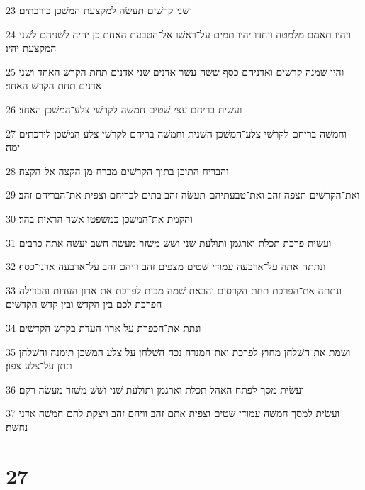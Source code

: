 \par 23 ושׁני קרשׁים תעשׂה למקצעת המשׁכן בירכתים׃
\par 24 ויהיו תאמם מלמטה ויחדו יהיו תמים על־ראשׁו אל־הטבעת האחת כן יהיה לשׁניהם לשׁני המקצעת יהיו׃
\par 25 והיו שׁמנה קרשׁים ואדניהם כסף שׁשׁה עשׂר אדנים שׁני אדנים תחת הקרשׁ האחד ושׁני אדנים תחת הקרשׁ האחד׃
\par 26 ועשׂית בריחם עצי שׁטים חמשׁה לקרשׁי צלע־המשׁכן האחד׃
\par 27 וחמשׁה בריחם לקרשׁי צלע־המשׁכן השׁנית וחמשׁה בריחם לקרשׁי צלע המשׁכן לירכתים ימה׃
\par 28 והבריח התיכן בתוך הקרשׁים מברח מן־הקצה אל־הקצה׃
\par 29 ואת־הקרשׁים תצפה זהב ואת־טבעתיהם תעשׂה זהב בתים לבריחם וצפית את־הבריחם זהב׃
\par 30 והקמת את־המשׁכן כמשׁפטו אשׁר הראית בהר׃
\par 31 ועשׂית פרכת תכלת וארגמן ותולעת שׁני ושׁשׁ משׁזר מעשׂה חשׁב יעשׂה אתה כרבים׃
\par 32 ונתתה אתה על־ארבעה עמודי שׁטים מצפים זהב וויהם זהב על־ארבעה אדני־כסף׃
\par 33 ונתתה את־הפרכת תחת הקרסים והבאת שׁמה מבית לפרכת את ארון העדות והבדילה הפרכת לכם בין הקדשׁ ובין קדשׁ הקדשׁים׃
\par 34 ונתת את־הכפרת על ארון העדת בקדשׁ הקדשׁים׃
\par 35 ושׂמת את־השׁלחן מחוץ לפרכת ואת־המנרה נכח השׁלחן על צלע המשׁכן תימנה והשׁלחן תתן על־צלע צפון׃
\par 36 ועשׂית מסך לפתח האהל תכלת וארגמן ותולעת שׁני ושׁשׁ משׁזר מעשׂה רקם׃
\par 37 ועשׂית למסך חמשׁה עמודי שׁטים וצפית אתם זהב וויהם זהב ויצקת להם חמשׁה אדני נחשׁת׃

\chapter{27}

